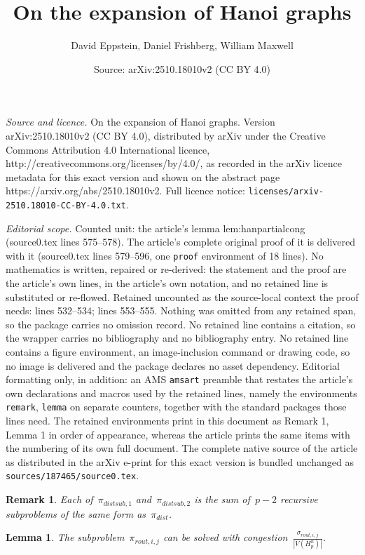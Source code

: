 \documentclass[10pt,a4paper]{amsart}
\title{On the expansion of Hanoi graphs}
\author{David Eppstein, Daniel Frishberg, William Maxwell}
\date{Source: arXiv:2510.18010v2 (CC BY 4.0)}
\newtheorem{remark}{Remark}
\newtheorem{lemma}{Lemma}
\begin{document}
\maketitle

\noindent\emph{Source and licence.} On the expansion of Hanoi graphs. Version arXiv:2510.18010v2 (CC BY 4.0), distributed by arXiv under the Creative Commons Attribution 4.0 International licence, http://creativecommons.org/licenses/by/4.0/, as recorded in the arXiv licence metadata for this exact version and shown on the abstract page https://arxiv.org/abs/2510.18010v2. Full licence notice: \texttt{licenses/arxiv-2510.18010-CC-BY-4.0.txt}.\par\smallskip

\noindent\textit{Editorial scope.} Counted unit: the article's lemma lem:hanpartialcong (source0.tex lines 575--578). The article's complete original proof of it is delivered with it (source0.tex lines 579--596, one \texttt{proof} environment of 18 lines). No mathematics is written, repaired or re-derived: the statement and the proof are the article's own lines, in the article's own notation, and no retained line is substituted or re-flowed.  Retained uncounted as the source-local context the proof needs: lines 532--534; lines 553--555.  Nothing was omitted from any retained span, so the package carries no omission record.  No retained line contains a citation, so the wrapper carries no bibliography and no bibliography entry.  No retained line contains a figure environment, an image-inclusion command or drawing code, so no image is delivered and the package declares no asset dependency.  Editorial formatting only, in addition: an AMS \texttt{amsart} preamble that restates the article's own declarations and macros used by the retained lines, namely the environments \texttt{remark}, \texttt{lemma} on separate counters, together with the standard packages those lines need.  The retained environments print in this document as Remark 1, Lemma 1 in order of appearance, whereas the article prints the same items with the numbering of its own full document.  The complete native source of the article as distributed in the arXiv e-print for this exact version is bundled unchanged as \texttt{sources/187465/source0.tex}.
\begin{remark}\label{rmk:fdistsubrecj}
Each of~$\pi_{distsub,1}$ and~$\pi_{distsub,2}$ is the sum of~$p-2$ recursive subproblems of the same form as~$\pi_{dist}$.
\end{remark}

\begin{lemma}\label{lem:fdistroutrec}
The subproblem~$\pi_{rout,i,j}$ can be solved with congestion~$\frac{\sigma_{rout,i,j}}{|V(H_p^n)|}$.
\end{lemma}
\end{document}
